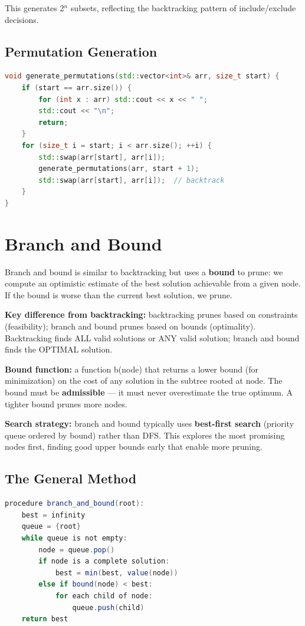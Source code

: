 This generates 2$^{n}$ subsets, reflecting the backtracking pattern of include/exclude decisions.

\subsection{Permutation Generation}

\begin{lstlisting}[language=C++]
void generate_permutations(std::vector<int>& arr, size_t start) {
    if (start == arr.size()) {
        for (int x : arr) std::cout << x << " ";
        std::cout << "\n";
        return;
    }
    for (size_t i = start; i < arr.size(); ++i) {
        std::swap(arr[start], arr[i]);
        generate_permutations(arr, start + 1);
        std::swap(arr[start], arr[i]);  // backtrack
    }
}
\end{lstlisting}

\section{Branch and Bound}

Branch and bound is similar to backtracking but uses a \textbf{bound} to prune: we compute an optimistic estimate of the best solution achievable from a given node. If the bound is worse than the current best solution, we prune.

\textbf{Key difference from backtracking:} backtracking prunes based on constraints (feasibility); branch and bound prunes based on bounds (optimality). Backtracking finds ALL valid solutions or ANY valid solution; branch and bound finds the OPTIMAL solution.

\textbf{Bound function:} a function b(node) that returns a lower bound (for minimization) on the cost of any solution in the subtree rooted at node. The bound must be \textbf{admissible} — it must never overestimate the true optimum. A tighter bound prunes more nodes.

\textbf{Search strategy:} branch and bound typically uses \textbf{best-first search} (priority queue ordered by bound) rather than DFS. This explores the most promising nodes first, finding good upper bounds early that enable more pruning.

\subsection{The General Method}

\begin{lstlisting}[language=Java]
procedure branch_and_bound(root):
    best = infinity
    queue = {root}
    while queue is not empty:
        node = queue.pop()
        if node is a complete solution:
            best = min(best, value(node))
        else if bound(node) < best:
            for each child of node:
                queue.push(child)
    return best
\end{lstlisting}

